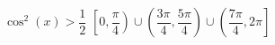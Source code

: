 { $\cos^{2} \left( x \right) > \dfrac{1}{2}$}
{ $\left[ 0, \dfrac{\pi}{4} \right) \cup \left( \dfrac{3\pi}{4}, \dfrac{5\pi}{4} \right) \cup \left( \dfrac{7\pi}{4}, 2\pi \right]$}
